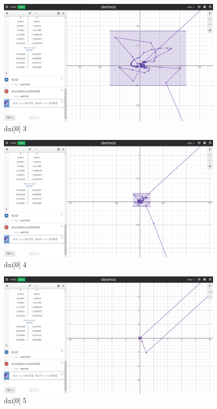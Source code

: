 \begin{figure}[H]
    \includegraphics[width=\columnwidth]{figs/dxi[0]_3}
    \caption{dxi[0] 3}
\end{figure}
\begin{figure}[H]
    \includegraphics[width=\columnwidth]{figs/dxi[0]_4}
    \caption{dxi[0] 4}
\end{figure}
\begin{figure}[H]
    \includegraphics[width=\columnwidth]{figs/dxi[0]_5}
    \caption{dxi[0] 5}
\end{figure}
